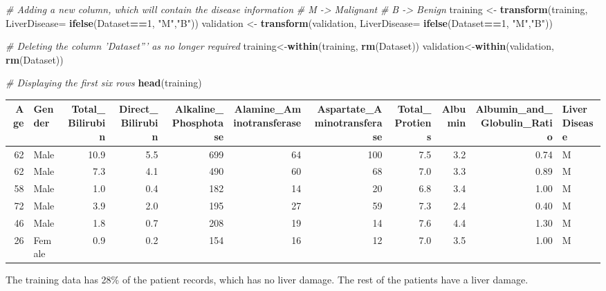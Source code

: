 \documentclass[]{article}
\newenvironment{Shaded}{\begin{snugshade}}{\end{snugshade}}
\newcommand{\CommentTok}[1]{\textcolor[rgb]{0.56,0.35,0.01}{\textit{#1}}}
\newcommand{\DataTypeTok}[1]{\textcolor[rgb]{0.13,0.29,0.53}{#1}}
\newcommand{\DecValTok}[1]{\textcolor[rgb]{0.00,0.00,0.81}{#1}}
\newcommand{\FloatTok}[1]{\textcolor[rgb]{0.00,0.00,0.81}{#1}}
\newcommand{\KeywordTok}[1]{\textcolor[rgb]{0.13,0.29,0.53}{\textbf{#1}}}
\newcommand{\NormalTok}[1]{#1}
\newcommand{\OperatorTok}[1]{\textcolor[rgb]{0.81,0.36,0.00}{\textbf{#1}}}
\newcommand{\StringTok}[1]{\textcolor[rgb]{0.31,0.60,0.02}{#1}}
\begin{document}
\begin{Shaded}
\begin{Highlighting}[]
\CommentTok{# Adding a new column, which will contain the disease information}
\CommentTok{# M -> Malignant}
\CommentTok{# B -> Benign}
\NormalTok{training <-}\StringTok{ }\KeywordTok{transform}\NormalTok{(training, }\DataTypeTok{LiverDisease=} \KeywordTok{ifelse}\NormalTok{(Dataset}\OperatorTok{==}\DecValTok{1}\NormalTok{, }\StringTok{"M"}\NormalTok{,}\StringTok{"B"}\NormalTok{))}
\NormalTok{validation <-}\StringTok{ }\KeywordTok{transform}\NormalTok{(validation, }\DataTypeTok{LiverDisease=} \KeywordTok{ifelse}\NormalTok{(Dataset}\OperatorTok{==}\DecValTok{1}\NormalTok{, }\StringTok{"M"}\NormalTok{,}\StringTok{"B"}\NormalTok{))}

\CommentTok{# Deleting the column 'Dataset''' as no longer required}
\NormalTok{training<-}\KeywordTok{within}\NormalTok{(training, }\KeywordTok{rm}\NormalTok{(Dataset))}
\NormalTok{validation<-}\KeywordTok{within}\NormalTok{(validation, }\KeywordTok{rm}\NormalTok{(Dataset))}

\CommentTok{# Displaying the first six rows}
\KeywordTok{head}\NormalTok{(training)}
\end{Highlighting}
\end{Shaded}

\begin{longtable}[]{@{}rlrrrrrrrrl@{}}
\toprule
Age & Gender & Total\_Bilirubin & Direct\_Bilirubin &
Alkaline\_Phosphotase & Alamine\_Aminotransferase &
Aspartate\_Aminotransferase & Total\_Protiens & Albumin &
Albumin\_and\_Globulin\_Ratio & LiverDisease\tabularnewline
\midrule
\endhead
62 & Male & 10.9 & 5.5 & 699 & 64 & 100 & 7.5 & 3.2 & 0.74 &
M\tabularnewline
62 & Male & 7.3 & 4.1 & 490 & 60 & 68 & 7.0 & 3.3 & 0.89 &
M\tabularnewline
58 & Male & 1.0 & 0.4 & 182 & 14 & 20 & 6.8 & 3.4 & 1.00 &
M\tabularnewline
72 & Male & 3.9 & 2.0 & 195 & 27 & 59 & 7.3 & 2.4 & 0.40 &
M\tabularnewline
46 & Male & 1.8 & 0.7 & 208 & 19 & 14 & 7.6 & 4.4 & 1.30 &
M\tabularnewline
26 & Female & 0.9 & 0.2 & 154 & 16 & 12 & 7.0 & 3.5 & 1.00 &
M\tabularnewline
\bottomrule
\end{longtable}

The training data has 28\% of the patient records, which has no liver
damage. The rest of the patients have a liver damage.

\begin{Shaded}
\end{Shaded}
\end{document}
